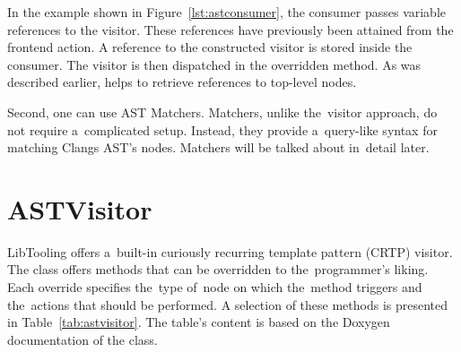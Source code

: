 In the example shown in Figure~\ref{lst:astconsumer}, the consumer passes 
variable references to the visitor. 
These references have previously been attained from the frontend action. 
A reference to the constructed visitor is stored inside the consumer. 
The visitor is then dispatched in the overridden 
 method. 
As was described earlier,  helps to retrieve references 
to top-level nodes.

Second, one can use AST Matchers. 
Matchers, unlike the~visitor approach, do not require a~complicated setup. 
Instead, they provide a~query-like syntax for matching Clangs AST's nodes. 
Matchers will be talked about in~detail later.

\section{ASTVisitor}

LibTooling offers a~built-in curiously recurring template pattern 
(CRTP) visitor. 
The class  \citep{visitor:online} 
offers  methods that 
can be overridden to the~programmer's liking. 
Each override specifies the~type of~node on which the~method 
triggers and the~actions that should be performed.
A selection of these methods is presented in Table~\ref{tab:astvisitor}. 
The table's content is based on the Doxygen documentation of
the  class.

